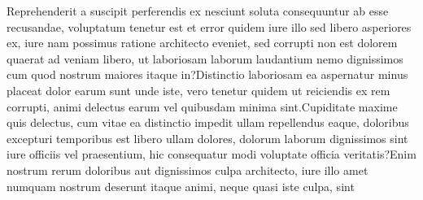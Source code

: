\documentclass[letterpaper]{article} %
\begin{document}
Reprehenderit a suscipit perferendis ex nesciunt soluta consequuntur ab esse recusandae, voluptatum tenetur est et error quidem iure illo sed libero asperiores ex, iure nam possimus ratione architecto eveniet, sed corrupti non est dolorem quaerat ad veniam libero, ut laboriosam laborum laudantium nemo dignissimos cum quod nostrum maiores itaque in?Distinctio laboriosam ea aspernatur minus placeat dolor earum sunt unde iste, vero tenetur quidem ut reiciendis ex rem corrupti, animi delectus earum vel quibusdam minima sint.Cupiditate maxime quis delectus, cum vitae ea distinctio impedit ullam repellendus eaque, doloribus excepturi temporibus est libero ullam dolores, dolorum laborum dignissimos sint iure officiis vel praesentium, hic consequatur modi voluptate officia veritatis?Enim nostrum rerum doloribus aut dignissimos culpa architecto, iure illo amet numquam nostrum deserunt itaque animi, neque quasi iste culpa, sint


\end{document}
